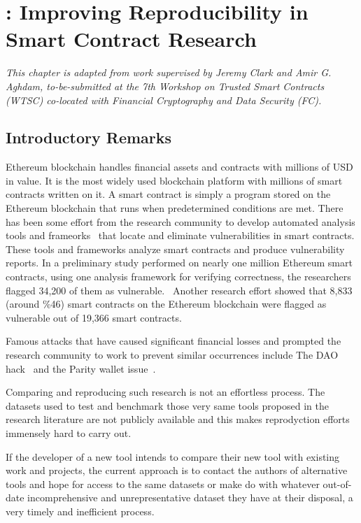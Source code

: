 \chapter{\etherbase: Improving Reproducibility in Smart Contract Research} \label{ch:etherbase}


\textit{
	This chapter is adapted from work supervised by Jeremy Clark and Amir G. Aghdam, to-be-submitted at the 7th Workshop on Trusted Smart Contracts (WTSC) co-located with Financial Cryptography and Data Security (FC).
}

\section{Introductory Remarks}
	\label{sec:intro}
	Ethereum blockchain handles financial assets and contracts with millions of USD in value.
	It is the most widely used blockchain platform with millions of smart contracts written on it.
	A smart contract is simply a program stored on the Ethereum blockchain that runs when predetermined conditions are met.
	There has been some effort from the research community to develop automated analysis tools and frameorks~\cite{ref_tools} that locate and eliminate vulnerabilities in smart contracts.
	These tools and frameworks analyze smart contracts and produce vulnerability reports.
	In a preliminary study performed on nearly one million Ethereum smart contracts, using one analysis framework for verifying correctness, the researchers flagged 34,200 of them as vulnerable.~\cite{ref_flag1}
	Another research effort showed that 8,833 (around \%46) smart contracts on the Ethereum blockchain were flagged as vulnerable out of 19,366 smart contracts.~\cite{ref_flag2}

	Famous attacks that have caused significant financial losses and prompted the research community to work to prevent similar occurrences include The DAO hack~\cite{dao} and the Parity wallet issue~\cite{ref_parity}.

	Comparing and reproducing such research is not an effortless process.
	The datasets used to test and benchmark those very same tools proposed in the research literature are not publicly available and this makes reprodyction efforts immensely hard to carry out.

	If the developer of a new tool intends to compare their new tool with existing work and projects, the current approach is to contact the authors of alternative tools and hope for access to the same datasets or make do with whatever out-of-date incomprehensive and unrepresentative dataset they have at their disposal, a very timely and inefficient process.

